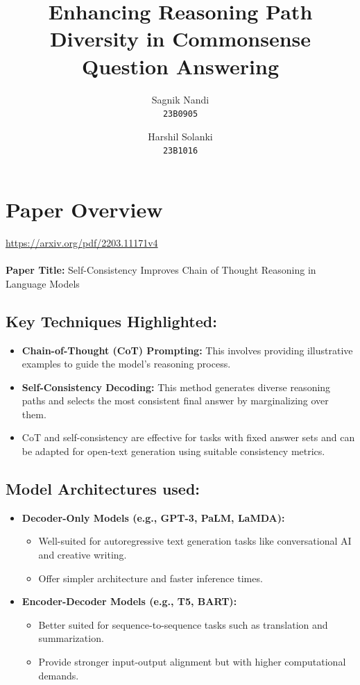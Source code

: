 \documentclass[24pt]{article}
\title{Enhancing Reasoning Path Diversity in Commonsense Question Answering}
\author{
  Sagnik Nandi\\
  \texttt{23B0905}
  \and
  Harshil Solanki\\
  \texttt{23B1016}
}
\date{}
\begin{document}
\maketitle
\tableofcontents
\clearpage



\section{Paper Overview}

\url{https://arxiv.org/pdf/2203.11171v4}\\ \\
\textbf{Paper Title:}
Self-Consistency Improves Chain of Thought Reasoning in Language Models\\

\subsection{Key Techniques Highlighted:}
    \begin{itemize}
        \item \textbf{Chain-of-Thought (CoT) Prompting:} This involves providing illustrative examples to guide the model's reasoning process.
        \item \textbf{Self-Consistency Decoding:} This method generates diverse reasoning paths and selects the most consistent final answer by marginalizing over them.
        \item CoT and self-consistency are effective for tasks with fixed answer sets and can be adapted for open-text generation using suitable consistency metrics.
    \end{itemize}
\subsection{Model Architectures used:}
    \begin{itemize}
        \item \textbf{Decoder-Only Models (e.g., GPT-3, PaLM, LaMDA):}
        \begin{itemize}
            \item Well-suited for autoregressive text generation tasks like conversational AI and creative writing.
            \item Offer simpler architecture and faster inference times.
        \end{itemize}
        \item \textbf{Encoder-Decoder Models (e.g., T5, BART):}
        \begin{itemize}
            \item Better suited for sequence-to-sequence tasks such as translation and summarization.
            \item Provide stronger input-output alignment but with higher computational demands.
        \end{itemize}
    \end{itemize}
\end{document}
